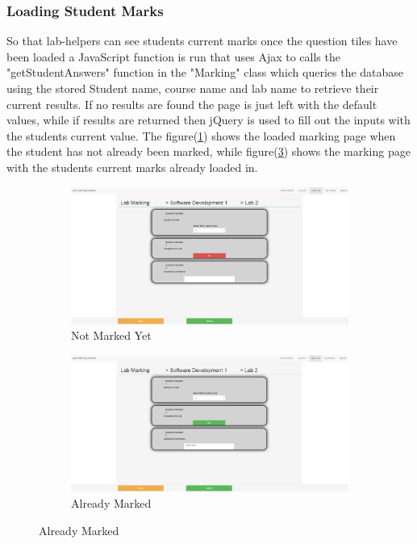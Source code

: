 \documentclass[12pt]{article}  %
\begin{document}
\subsubsection{Loading Student Marks}

So that lab-helpers can see students current marks once the question tiles have been loaded a JavaScript function is run that uses Ajax to calls the "getStudentAnswers" function in the "Marking" class which queries the database using the stored Student name, course name and lab name to retrieve their current results. If no results are found the page is just left with the default values, while if results are returned then jQuery is used to fill out the inputs with the students current value. The figure(\ref{fig:marking-not}) shows the loaded marking page when the student has not already been marked, while figure(\ref{fig:marking-already}) shows the marking page with the students current marks already loaded in.

\begin{figure}[H]
\caption{Marking Student Page}
\centering
\begin{subfigure}[c]{0.45\textwidth}
    \includegraphics[width=1\textwidth]{images/implementation/marking-5-page.png}
    \caption{Not Marked Yet}
    \label{fig:marking-not}
\end{subfigure}
\hfill
\begin{subfigure}[c]{0.45\textwidth}
    \includegraphics[width=1\textwidth]{images/implementation/marking-6-page.png}
    \caption{Already Marked}
    \label{fig:marking-already}
\end{subfigure}

\end{figure}
\end{document}

